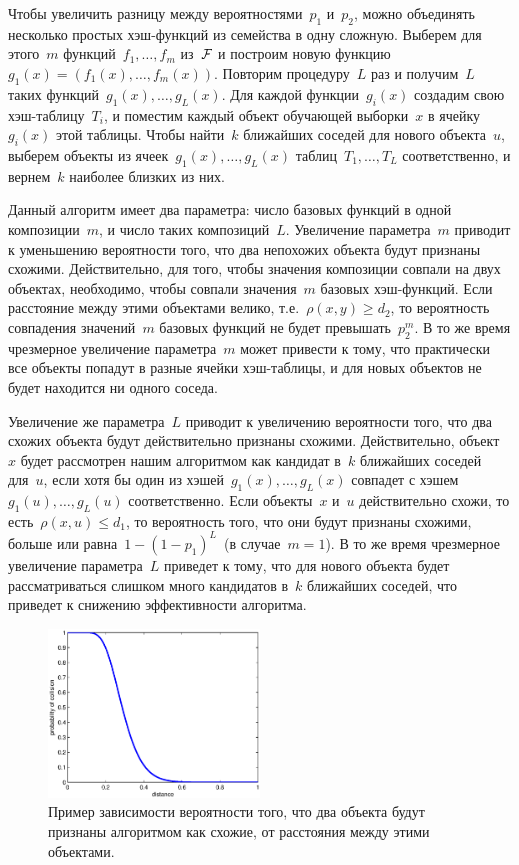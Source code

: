 \documentclass[12pt,fleqn]{article}
\begin{document}
Чтобы увеличить разницу между вероятностями~$p_1$ и~$p_2$,
можно объединять несколько простых хэш-функций из семейства
в одну сложную.
Выберем для этого~$m$ функций~$f_1, \dots, f_m$ из~$\mathcal{F}$
и построим новую функцию~$g_1(x) = (f_1(x), \dots, f_m(x))$.
Повторим процедуру~$L$ раз и получим~$L$ таких функций~$g_1(x), \dots, g_L(x)$.
Для каждой функции~$g_i(x)$ создадим свою хэш-таблицу~$T_i$,
и поместим каждый объект обучающей выборки~$x$ в ячейку~$g_i(x)$ этой таблицы.
Чтобы найти~$k$ ближайших соседей для нового объекта~$u$,
выберем объекты из ячеек~$g_1(x), \dots, g_L(x)$ таблиц~$T_1, \dots, T_L$
соответственно, и вернем~$k$ наиболее близких из них.

Данный алгоритм имеет два параметра: число базовых функций в одной композиции~$m$,
и число таких композиций~$L$.
Увеличение параметра~$m$ приводит к уменьшению вероятности того,
что два непохожих объекта будут признаны схожими.
Действительно, для того, чтобы значения композиции совпали на двух объектах,
необходимо, чтобы совпали значения~$m$ базовых хэш-функций.
Если расстояние между этими объектами велико, т.е.~$\rho(x, y) \geq d_2$,
то вероятность совпадения значений~$m$ базовых функций не будет превышать~$p_2^m$.
В то же время чрезмерное увеличение параметра~$m$ может привести к тому,
что практически все объекты попадут в разные ячейки хэш-таблицы,
и для новых объектов не будет находится ни одного соседа.

Увеличение же параметра~$L$ приводит к увеличению вероятности того,
что два схожих объекта будут действительно признаны схожими.
Действительно, объект~$x$ будет рассмотрен нашим алгоритмом
как кандидат в~$k$ ближайших соседей для~$u$, если хотя бы
один из хэшей~$g_1(x), \dots, g_L(x)$ совпадет с хэшем~$g_1(u), \dots, g_L(u)$
соответственно.
Если объекты~$x$ и~$u$ действительно схожи, то есть~$\rho(x, u) \leq d_1$,
то вероятность того, что они будут признаны схожими, больше или равна~$1 - (1 - p_1)^L$~(в случае~$m = 1$).
В то же время чрезмерное увеличение параметра~$L$ приведет к тому,
что для нового объекта будет рассматриваться слишком много кандидатов в~$k$ ближайших соседей,
что приведет к снижению эффективности алгоритма.

\begin{figure}[t]
    \centering
    \includegraphics[width=0.5\textwidth]{pic_lsh_curve.eps}
    \caption{Пример зависимости вероятности того, что два объекта будут признаны алгоритмом как схожие,
        от расстояния между этими объектами.}
    \label{pic:lshCurve}
\end{figure}
\end{document}
